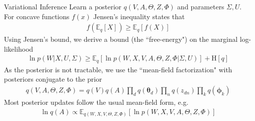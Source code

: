 \documentclass[xcolor=dvipsnames]{beamer}
\newcommand \ent[1] {
    \text{H} \left[ #1 \right]
}
\newcommand \ex[2] {
    \mathbb{E}_{ { #2 } }\left[ #1 \right]
}
\newcommand \vv[1] { \boldsymbol #1 }
\newcommand \thd[0]  { { \vv \theta_d } }
\begin{document}
\begin{frame}{Variational Inference}
 {
    Learn a posterior $q(V,A,\Theta,Z,\Phi)$ and parameters $\Sigma, U$. \\
    \medskip
} {
    For concave functions $f(x)$ Jensen's inequality states that
    \begin{align*}
    f \left( \ex{X}{q} \right) \geq \ex{f(X)}{q}
    \end{align*}
}
 {
    Using Jensen's bound, we derive a bound (the ``free-energy") on the marginal log-likelihood
    \begin{align*}
    \ln p(W|X,U,\Sigma) \geq \ex{\ln p(W,X,V,A,\Theta,Z,\Phi | \Sigma, U)}{q} + \ent{q}
    \end{align*}
}
 {
    As the posterior is not tractable, we use the ``mean-field factorization" with posteriors conjugate to the prior
    \begin{align*}
    q(V,A,\Theta,Z,\Phi) = q(V)q(A)\prod_d q(\thd)\prod_n q(z_{dn}) \prod_k q(\vv{\phi}_k)
    \end{align*}
}
 {
    Most posterior updates follow the usual mean-field form, e.g.
    \begin{align*}
    \ln q(A) \propto \ex{\ln p(W,X,V,A,\Theta,Z,\Phi)}{q(W,X,V,\Theta,Z,\Phi)}
    \end{align*}
}
\end{frame}


\end{document}
